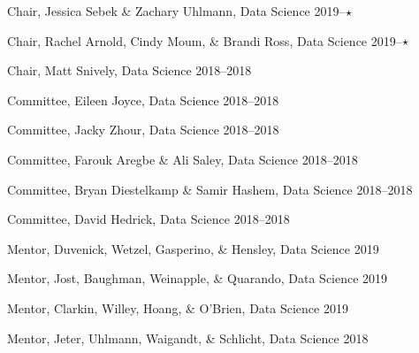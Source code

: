 \begin{innerlist}
      \item Chair, Jessica Sebek \& Zachary Uhlmann, Data Science               \hfill 2019--$\star\hspace{1.5em}$
      \item Chair, Rachel Arnold, Cindy Moum, \& Brandi Ross, Data Science      \hfill 2019--$\star\hspace{1.5em}$
      \item Chair, Matt Snively, Data Science                                   \hfill 2018--2018
      \item Committee, Eileen Joyce, Data Science                               \hfill 2018--2018
      \item Committee, Jacky Zhour, Data Science                                \hfill 2018--2018
      \item Committee, Farouk Aregbe \& Ali Saley, Data Science                 \hfill 2018--2018
      \item Committee, Bryan Diestelkamp \& Samir Hashem, Data Science          \hfill 2018--2018
      \item Committee, David Hedrick, Data Science                              \hfill 2018--2018

      \item Mentor, Duvenick, Wetzel, Gasperino, \& Hensley, Data Science       \hfill 2019
      \item Mentor, Jost, Baughman, Weinapple, \& Quarando, Data Science        \hfill 2019
      \item Mentor, Clarkin, Willey, Hoang, \& O'Brien, Data Science            \hfill 2019
      \item Mentor, Jeter, Uhlmann, Waigandt, \& Schlicht, Data Science         \hfill 2018
    \end{innerlist}\vspace{-.1in}
